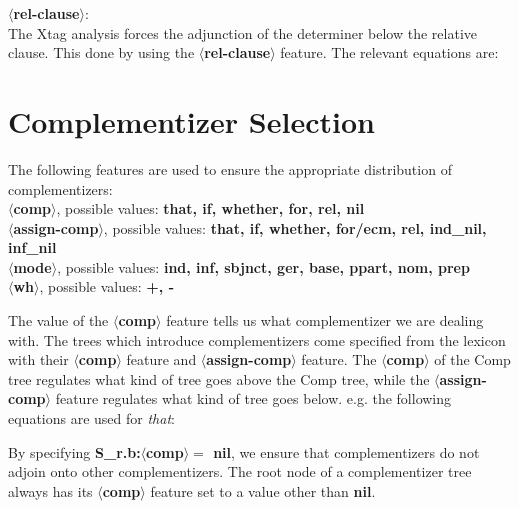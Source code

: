 {\bf $\langle$rel-clause$\rangle$}:\\
The Xtag analysis forces the adjunction of the determiner 
below the relative clause. This done by using the {\bf $\langle$rel-clause$\rangle$}
feature. The relevant equations are:





\section{Complementizer Selection}
The following features are used to ensure the appropriate distribution
of complementizers:
\\
{\bf $\langle$comp$\rangle$}, possible values: {\bf that, if, whether, for, rel, nil}\\
{\bf $\langle$assign-comp$\rangle$}, possible values: {\bf that, if, whether, for/ecm, 
rel, ind\_nil, inf\_nil}\\
{\bf $\langle$mode$\rangle$}, possible values: {\bf ind, inf, sbjnct, ger, base, ppart, 
nom, prep}\\
{\bf $\langle$wh$\rangle$}, possible values: {\bf +, -}

The value of the {\bf $\langle$comp$\rangle$} feature tells us what complementizer we 
are dealing with. The trees which introduce complementizers come 
specified from the lexicon with their 
{\bf $\langle$comp$\rangle$} feature and {\bf $\langle$assign-comp$\rangle$} 
feature. The {\bf $\langle$comp$\rangle$} of the Comp tree regulates 
what kind of tree goes above the Comp tree, while the 
{\bf $\langle$assign-comp$\rangle$} feature regulates what kind of tree
goes below.
e.g.
the following equations are used for {\em that}:


By specifying {\bf S_{r}.b:$\langle$comp$\rangle =$ nil}, we ensure that
complementizers do not adjoin onto other complementizers. The root node
of a complementizer tree always has its {\bf $\langle$comp$\rangle$} feature
set to a value other than {\bf nil}.


